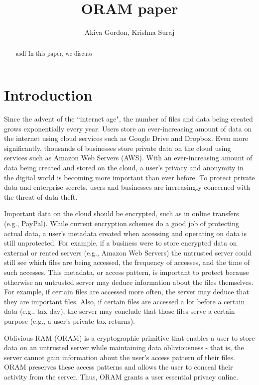 \documentclass[12pt, oneside]{article}   	%
\title{ORAM paper}
\author{Akiva Gordon, Krishna Suraj}
\date{}							%
\begin{document}
\maketitle

\begin{abstract}
asdf
In this paper, we discuss 
\end{abstract}


\section{Introduction}
Since the advent of the ``internet age", the number of files and data being created grows exponentially every year. Users store an ever-increasing amount of data on the internet using cloud services such as Google Drive and Dropbox. Even more significantly, thousands of businesses store private data on the cloud using services such as Amazon Web Servers (AWS). With an ever-increasing amount of data being created and stored on the cloud, a user's privacy and anonymity in the digital world is becoming more important than ever before. To protect private data and enterprise secrets, users and businesses are increasingly concerned with the threat of data theft.

Important data on the cloud should be encrypted, such as in online transfers (e.g., PayPal). While current encryption schemes do a good job of protecting actual data, a user's metadata created when accessing and operating on data is still unprotected. For example, if a business were to store encrypted data on external or rented servers (e.g., Amazon Web Servers) the untrusted server could still see which files are being accessed, the frequency of accesses, and the time of such accesses. This metadata, or access pattern, is important to protect because otherwise an untrusted server may deduce information about the files themselves. For example, if certain files are accessed more often, the server may deduce that they are important files. Also, if certain files are accessed a lot before a certain data (e.g., tax day), the server may conclude that those files serve a certain purpose (e.g., a user's private tax returns).

Oblivious RAM (ORAM) is a cryptographic primitive that enables a user to store data on an untrusted server while maintaining data obliviousness - that is, the server cannot gain information about the user's access pattern of their files. ORAM preserves these access patterns and allows the user to conceal their activity from the server. Thus, ORAM grants a user essential privacy online.%
\end{document}
